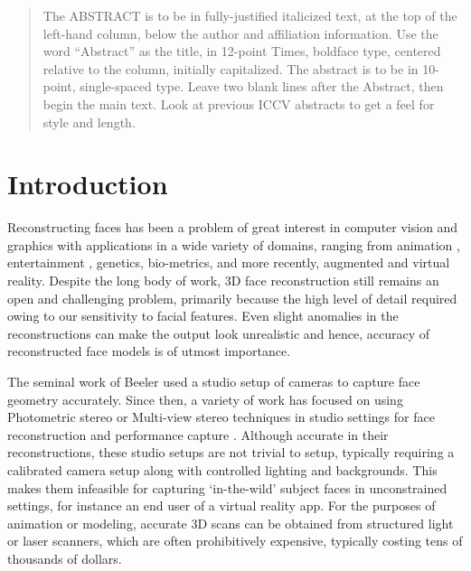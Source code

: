 \documentclass[10pt,twocolumn,letterpaper]{article}
\begin{document}
\begin{abstract}
   The ABSTRACT is to be in fully-justified italicized text, at the top
   of the left-hand column, below the author and affiliation
   information. Use the word ``Abstract'' as the title, in 12-point
   Times, boldface type, centered relative to the column, initially
   capitalized. The abstract is to be in 10-point, single-spaced type.
   Leave two blank lines after the Abstract, then begin the main text.
   Look at previous ICCV abstracts to get a feel for style and length.
\end{abstract}

\section{Introduction}


Reconstructing faces has been a problem of great interest in computer vision and graphics with applications in a wide variety of domains, ranging from animation \cite{ichim2015dynamic}, entertainment \cite{saito2016real}, genetics, bio-metrics, and more recently, augmented and virtual reality. Despite the long body of work, 3D face reconstruction still remains an open and challenging problem, primarily because the high level of detail required owing to our sensitivity to facial features. Even slight anomalies in the reconstructions can make the output look unrealistic and hence, accuracy of reconstructed face models is of utmost importance.


The seminal work of Beeler \etal \cite{beeler2010high} used a studio setup of cameras to capture face geometry accurately. Since then, a variety of work has focused on using Photometric stereo or Multi-view stereo techniques in studio settings for face reconstruction and performance capture \cite{cao2018sparse, fyffe2017multi}. 
Although accurate in their reconstructions, these studio setups are not trivial to setup, typically requiring a calibrated camera setup along with controlled lighting and backgrounds. This makes them infeasible for capturing `in-the-wild' subject faces in unconstrained settings, for instance an end user of a virtual reality app. For the purposes of animation or modeling, accurate 3D scans can be obtained from structured light or laser scanners, which are often prohibitively expensive, typically costing tens of thousands of dollars. 
\end{document}
